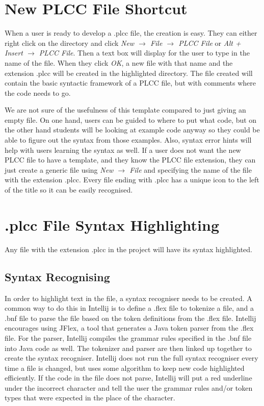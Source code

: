 \documentclass[conference, letterpaper]{IEEEtran}
\begin{document}
\section{New PLCC File Shortcut}\label{sec:new-plcc-file-shortcut}
When a user is ready to develop a .plcc file, the creation is easy.
They can either right click on the directory and click \textit{New $\rightarrow$ File $\rightarrow$ PLCC File} or \textit{Alt + Insert $\rightarrow$ PLCC File}.
Then a text box will display for the user to type in the name of the file.
When they click \textit{OK}, a new file with that name and the extension .plcc will be created in the highlighted directory.
The file created will contain the basic syntactic framework of a PLCC file, but with comments where the code needs to go.
\par We are not sure of the usefulness of this template compared to just giving an empty file.
On one hand, users can be guided to where to put what code, but on the other hand students will be looking at example code anyway so they could be able to figure out the syntax from those examples.
Also, syntax error hints will help with users learning the syntax as well.
If a user does not want the new PLCC file to have a template, and they know the PLCC file extension, they can just create a generic file using \textit{New $\rightarrow$ File} and specifying the name of the file with the extension .plcc.
Every file ending with .plcc has a unique icon to the left of the title so it can be easily recognised.


\section{.plcc File Syntax Highlighting}\label{sec:new-.plcc-file-syntax-highlighting}
Any file with the extension .plcc in the project will have its syntax highlighted.

\subsection{Syntax Recognising}\label{subsec:syntax-recognising}
In order to highlight text in the file, a syntax recogniser needs to be created.
A common way to do this in Intellij is to define a .flex file to tokenize a file, and a .bnf file to parse the file based on the token definitions from the .flex file.
Intellij encourages using JFlex, a tool that generates a Java token parser from the .flex file.
For the parser, Intellij compiles the grammar rules specified in the .bnf file into Java code as well.
The tokenizer and parser are then linked up together to create the syntax recogniser.
Intellij does not run the full syntax recogniser every time a file is changed, but uses some algorithm to keep new code highlighted efficiently.
If the code in the file does not parse, Intellij will put a red underline under the incorrect character and tell the user the grammar rules and/or token types that were expected in the place of the character.
\end{document}
